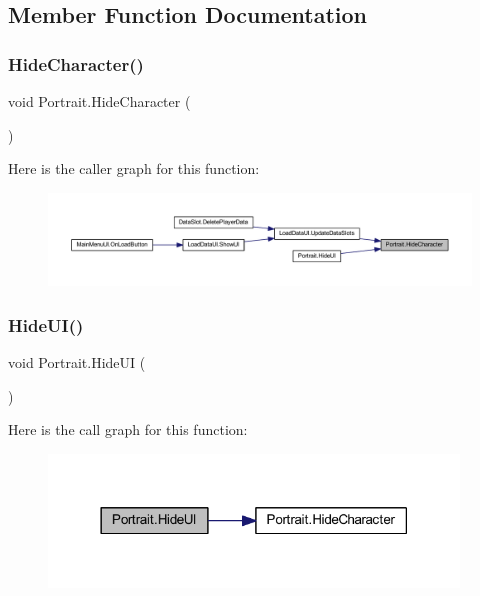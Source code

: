 \subsection{Member Function Documentation}
\mbox{\label{class_portrait_a3a0b6a4d3c9909127c51c4c4f4b152f5}} 
\subsubsection{\texorpdfstring{HideCharacter()}{HideCharacter()}}
{\footnotesize\ttfamily void Portrait.\+Hide\+Character (\begin{DoxyParamCaption}{ }\end{DoxyParamCaption})}

Here is the caller graph for this function\+:\nopagebreak
\begin{figure}[H]
\begin{center}
\leavevmode
\includegraphics[width=350pt]{class_portrait_a3a0b6a4d3c9909127c51c4c4f4b152f5_icgraph}
\end{center}
\end{figure}
\mbox{\label{class_portrait_ac5ab4bb350640a35c516bffa2fc45fe3}} 
\subsubsection{\texorpdfstring{HideUI()}{HideUI()}}
{\footnotesize\ttfamily void Portrait.\+Hide\+UI (\begin{DoxyParamCaption}{ }\end{DoxyParamCaption})}

Here is the call graph for this function\+:\nopagebreak
\begin{figure}[H]
\begin{center}
\leavevmode
\includegraphics[width=309pt]{class_portrait_ac5ab4bb350640a35c516bffa2fc45fe3_cgraph}
\end{center}
\end{figure}
\mbox{\label{class_portrait_a003483e7707bbb34e09ef3736e5b5b41}} 
